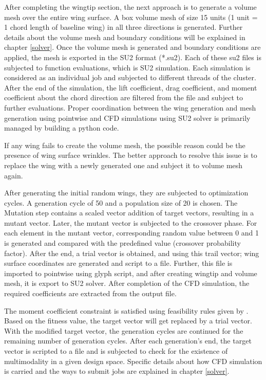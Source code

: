 After completing the wingtip section, the next approach is to generate a volume mesh over the entire wing surface. A box volume mesh of size 15 units (1 unit = 1 chord length of baseline wing) in all three directions is generated. Further details about the volume mesh and boundary conditions will be explained in chapter \ref{solver}. Once the volume mesh is generated and boundary conditions are applied, the mesh is exported in the SU2 format (*.su2). Each of these su2 files is subjected to function evaluations, which is SU2 simulation. Each simulation is considered as an individual job and subjected to different threads of the cluster. After the end of the simulation, the lift coefficient, drag coefficient, and moment coefficient about the chord direction are filtered from the file and subject to further evaluations. Proper coordination between the wing generation and mesh generation using pointwise and CFD simulations using SU2 solver is primarily managed by building a python code.

If any wing fails to create the volume mesh, the possible reason could be the presence of wing surface wrinkles. The better approach to resolve this issue is to replace the wing with a newly generated one and subject it to volume mesh again. 

After generating the initial random wings, they are subjected to optimization cycles. A generation cycle of 50 and a population size of 20 is chosen. The Mutation step contains a scaled vector addition of target vectors, resulting in a mutant vector. Later, the mutant vector is subjected to the crossover phase. For each element in the mutant vector, corresponding random value between 0 and 1 is generated and compared with the predefined value (crossover probability factor). After the end, a trial vector is obtained, and using this trail vector; wing surface coordinates are generated and script to a file. Further, this file is imported to pointwise using glyph script, and after creating wingtip and volume mesh, it is export to SU2 solver. After completion of the CFD simulation, the required coefficients are extracted from the output file.

The moment coefficient constraint is satisfied using feasibility rules given by \cite{Deb}. Based on the fitness value, the target vector will get replaced by a trial vector. With the modified target vector, the generation cycles are continued for the remaining number of generation cycles. After each generation's end, the target vector is scripted to a file and is subjected to check for the existence of multimodality in a given design space. Specific details about how CFD simulation is carried and the ways to submit jobs are explained in chapter \ref{solver}. 